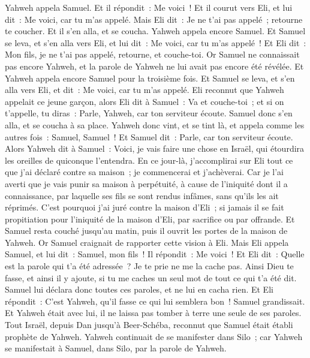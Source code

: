 \begin{multicols}{2}
Yahweh appela Samuel. Et il répondit~: Me voici~!
Et il courut vers Eli, et lui dit~: Me voici, car tu m'as appelé. Mais Eli dit~: Je ne t'ai pas appelé~; retourne te coucher. Et il s'en alla, et se coucha.
Yahweh appela encore Samuel. Et Samuel se leva, et s'en alla vers Eli, et lui dit~: Me voici, car tu m'as appelé~! Et Eli dit~: Mon fils, je ne t'ai pas appelé, retourne, et couche-toi.
Or Samuel ne connaissait pas encore Yahweh, et la parole de Yahweh ne lui avait pas encore été révélée.
Et Yahweh appela encore Samuel pour la troisième fois. Et Samuel se leva, et s'en alla vers Eli, et dit~: Me voici, car tu m'as appelé. Eli reconnut que Yahweh appelait ce jeune garçon,
alors Eli dit à Samuel~: Va et couche-toi~; et si on t'appelle, tu diras~: Parle, Yahweh, car ton serviteur écoute. Samuel donc s'en alla, et se coucha à sa place.
Yahweh donc vint, et se tint là, et appela comme les autres fois~: Samuel, Samuel~! Et Samuel dit~: Parle, car ton serviteur écoute.
Alors Yahweh dit à Samuel~: Voici, je vais faire une chose en Israël, qui étourdira les oreilles de quiconque l'entendra.
En ce jour-là, j'accomplirai sur Eli tout ce que j'ai déclaré contre sa maison~; je commencerai et j'achèverai.
Car je l'ai averti que je vais punir sa maison à perpétuité, à cause de l'iniquité dont il a connaissance, par laquelle ses fils se sont rendus infâmes, sans qu'ils les ait réprimés.
C'est pourquoi j'ai juré contre la maison d'Eli~; si jamais il se fait propitiation pour l'iniquité de la maison d'Eli, par sacrifice ou par offrande.
Et Samuel resta couché jusqu'au matin, puis il ouvrit les portes de la maison de Yahweh. Or Samuel craignait de rapporter cette vision à Eli.
Mais Eli appela Samuel, et lui dit~: Samuel, mon fils~! Il répondit~: Me voici~!
Et Eli dit~: Quelle est la parole qui t'a été adressée~? Je te prie ne me la cache pas. Ainsi Dieu te fasse, et ainsi il y ajoute, si tu me caches un seul mot de tout ce qui t'a été dit.
Samuel lui déclara donc toutes ces paroles, et ne lui en cacha rien. Et Eli répondit~: C'est Yahweh, qu'il fasse ce qui lui semblera bon~!
Samuel grandissait. Et Yahweh était avec lui, il ne laissa pas tomber à terre une seule de ses paroles.
Tout Israël, depuis Dan jusqu'à Beer-Schéba, reconnut que Samuel était établi prophète de Yahweh.
Yahweh continuait de se manifester dans Silo~; car Yahweh se manifestait à Samuel, dans Silo, par la parole de Yahweh.

\end{multicols}
